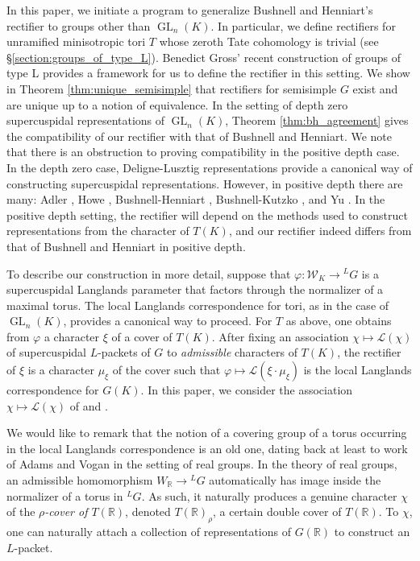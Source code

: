 \documentclass{compositio}
\theoremstyle{plain}
\theoremstyle{definition}
\numberwithin{equation}{section}
\DeclareMathOperator{\GL}{GL}
\newcommand{\Weil}{\mathcal{W}}
\newcommand{\Lpack}{\mathcal{L}}
\begin{document}
In this paper, we initiate a program to generalize Bushnell and Henniart's
rectifier to groups other than $\GL_n(K)$.  In particular, we define rectifiers for
unramified minisotropic tori $T$ whose zeroth Tate cohomology is trivial (see \S\ref{section:groups_of_type_L}).
Benedict Gross' recent construction of groups of type L provides a framework for
us to define the rectifier in this setting.
We show in Theorem \ref{thm:unique_semisimple} that rectifiers for semisimple $G$ exist
and are unique up to a notion of equivalence. In the setting of depth zero
supercuspidal representations of $\GL_{n}(K)$, Theorem \ref{thm:bh_agreement}
gives the compatibility of our rectifier with that of Bushnell and Henniart.
We note that there is an obstruction to proving compatibility in the positive depth case.
In the depth zero case, Deligne-Lusztig representations provide a canonical way of
constructing supercuspidal representations. However, in positive depth there are many:
Adler \cite{adler:98a}, Howe \cite{howe:77a}, Bushnell-Henniart \cite{bushnell-henniart:10a},
Bushnell-Kutzko \cite{bushnell-kutzko:AdmissibleDual}, and Yu \cite{yu:03a}.
In the positive depth setting, the rectifier will depend on the methods
used to construct representations from the character of $T(K)$, and
our rectifier indeed differs from that of Bushnell and Henniart in positive depth.

To describe our construction in more detail, suppose that $\varphi : \Weil_K \rightarrow {}^L G$ is a supercuspidal Langlands parameter
that factors through the normalizer of a maximal torus.
The local Langlands correspondence for tori, as in the case of $\GL_n(K)$, provides a canonical way to proceed.  For $T$ as above, one
obtains from $\varphi$ a character $\xi$ of a cover of $T(K)$.
After fixing an association $\chi \mapsto \Lpack(\chi)$ of supercuspidal $L$-packets of $G$
to \emph{admissible} characters of $T(K)$, the rectifier of $\xi$ is a character
$\mu_{\xi}$ of the cover such that $\varphi \mapsto \Lpack(\xi \cdot \mu_{\xi})$
is the local Langlands correspondence for $G(K)$.  In this paper, we consider the association
$\chi \mapsto \Lpack(\chi)$ of \cite{reeder-debacker:09a} and \cite{reeder:08a}.

We would like to remark that the notion of a covering group of a torus occurring in the local Langlands
correspondence is an old one, dating back at least to work of Adams and Vogan \cite{adams-vogan:91}
in the setting of real groups.  In the theory of real groups, an admissible homomorphism
$W_{\mathbb{R}} \rightarrow {}^L G$ automatically has image inside the normalizer of a torus in ${}^L G$.
As such, it naturally produces a genuine character $\chi$ of the \emph{$\rho$-cover of $T(\mathbb{R})$},
denoted $T(\mathbb{R})_{\rho}$, a certain double cover of $T(\mathbb{R})$.  To $\chi$,
one can naturally attach a collection of representations of $G(\mathbb{R})$ to construct an $L$-packet.
\end{document}
